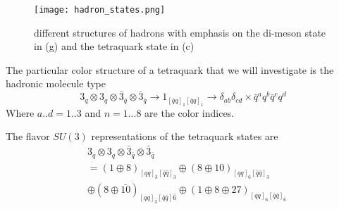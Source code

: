 \begin{figure}[h]
    \texttt{[image: hadron\_states.png]}
    \caption{different structures of hadrons with emphasis on the di-meson state in (g) and the tetraquark state in (c)}
    \label{fig:figure6}
    \end{figure}
The particular color structure of a tetraquark that we will investigate is the hadronic molecule type 
\begin{equation}
    3_q \otimes 3_q \otimes \bar{3}_{\bar{q}} \otimes \bar{3}_{\bar{q}} \rightarrow 1_{[\bar{q}q]_1[\bar{q}q]_1} \rightarrow \delta_{ab} \delta_{cd} \times \bar{q}^aq^b\bar{q}^cq^d 
\end{equation}
Where $a..d = 1..3$ and $n=1...8$ are the color indices. 

The flavor $SU(3)$ representations of the tetraquark states are \cite{sym15071298}
\begin{align}
& 3_q \otimes 3_q \otimes \bar{3}_{\bar{q}} \otimes \bar{3}_{\bar{q}} \nonumber \\
& = (1 \oplus 8)_{[qq]_{\bar{3}}[\bar{q}\bar{q}]_3} \oplus (8 \oplus 10)_{[qq]_6[\bar{q}\bar{q}]_3} \nonumber \\
& \oplus (8 \oplus \bar{10})_{[qq]_{\bar{3}}[\bar{q}\bar{q}]\bar{6}} \oplus (1 \oplus 8 \oplus 27)_{[qq]_6[\bar{q}\bar{q}]_{\bar{6}}}
\end{align} 



    